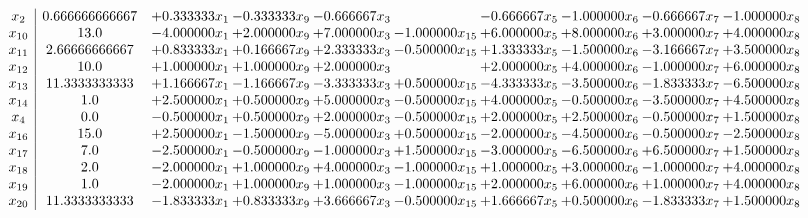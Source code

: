 \documentclass[10pt]{article}
\begin{document}
 \[\begin{array}{c| c c@{\hskip 2pt} c@{\hskip 2pt} c@{\hskip 2pt} c@{\hskip 2pt} c@{\hskip 2pt} c@{\hskip 2pt} c@{\hskip 2pt} c@{\hskip 2pt} }
 x_{2}   &  0.666666666667 & + 0.333333 x_{1} & -0.333333 x_{9} & -0.666667 x_{3} &   & -0.666667 x_{5} & -1.000000 x_{6} & -0.666667 x_{7} & -1.000000 x_{8}\\
 x_{10}   &  13.0 & -4.000000 x_{1} & + 2.000000 x_{9} & + 7.000000 x_{3} & -1.000000 x_{15} & + 6.000000 x_{5} & + 8.000000 x_{6} & + 3.000000 x_{7} & + 4.000000 x_{8}\\
 x_{11}   &  2.66666666667 & + 0.833333 x_{1} & + 0.166667 x_{9} & + 2.333333 x_{3} & -0.500000 x_{15} & + 1.333333 x_{5} & -1.500000 x_{6} & -3.166667 x_{7} & + 3.500000 x_{8}\\
 x_{12}   &  10.0 & + 1.000000 x_{1} & + 1.000000 x_{9} & + 2.000000 x_{3} &   & + 2.000000 x_{5} & + 4.000000 x_{6} & -1.000000 x_{7} & + 6.000000 x_{8}\\
 x_{13}   &  11.3333333333 & + 1.166667 x_{1} & -1.166667 x_{9} & -3.333333 x_{3} & + 0.500000 x_{15} & -4.333333 x_{5} & -3.500000 x_{6} & -1.833333 x_{7} & -6.500000 x_{8}\\
 x_{14}   &  1.0 & + 2.500000 x_{1} & + 0.500000 x_{9} & + 5.000000 x_{3} & -0.500000 x_{15} & + 4.000000 x_{5} & -0.500000 x_{6} & -3.500000 x_{7} & + 4.500000 x_{8}\\
 x_{4}   &  0.0 & -0.500000 x_{1} & + 0.500000 x_{9} & + 2.000000 x_{3} & -0.500000 x_{15} & + 2.000000 x_{5} & + 2.500000 x_{6} & -0.500000 x_{7} & + 1.500000 x_{8}\\
 x_{16}   &  15.0 & + 2.500000 x_{1} & -1.500000 x_{9} & -5.000000 x_{3} & + 0.500000 x_{15} & -2.000000 x_{5} & -4.500000 x_{6} & -0.500000 x_{7} & -2.500000 x_{8}\\
 x_{17}   &  7.0 & -2.500000 x_{1} & -0.500000 x_{9} & -1.000000 x_{3} & + 1.500000 x_{15} & -3.000000 x_{5} & -6.500000 x_{6} & + 6.500000 x_{7} & + 1.500000 x_{8}\\
 x_{18}   &  2.0 & -2.000000 x_{1} & + 1.000000 x_{9} & + 4.000000 x_{3} & -1.000000 x_{15} & + 1.000000 x_{5} & + 3.000000 x_{6} & -1.000000 x_{7} & + 4.000000 x_{8}\\
 x_{19}   &  1.0 & -2.000000 x_{1} & + 1.000000 x_{9} & + 1.000000 x_{3} & -1.000000 x_{15} & + 2.000000 x_{5} & + 6.000000 x_{6} & + 1.000000 x_{7} & + 4.000000 x_{8}\\
 x_{20}   &  11.3333333333 & -1.833333 x_{1} & + 0.833333 x_{9} & + 3.666667 x_{3} & -0.500000 x_{15} & + 1.666667 x_{5} & + 0.500000 x_{6} & -1.833333 x_{7} & + 1.500000 x_{8}\\

\end{array}\]
\end{document}
